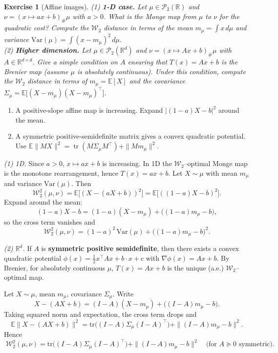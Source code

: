 \documentclass[11pt,a4paper]{article}
\theoremstyle{exostyle}
\newtheorem{exercise}{Exercise}
\newcommand{\R}{\mathbb{R}}
\newcommand{\push}{\#}
\newcommand{\Wtwo}{\mathcal{W}_2}
\begin{document}
\begin{exercise}[Affine images]\label{ex:affine}
(1) \textbf{1-D case.} Let $\mu\in\mathcal P_2(\R)$ and $\nu=(x\mapsto a x+b)_{\push}\mu$ with $a>0$. What is the Monge map from $\mu$ to $\nu$ for the quadratic cost? Compute the $\Wtwo$ distance in terms of the mean $m_\mu=\int x\,d\mu$ and variance $\mathrm{Var}(\mu)=\int (x-m_\mu)^2\,d\mu$.\\[4pt]
(2) \textbf{Higher dimension.} Let $\mu\in\mathcal P_2(\R^d)$ and $\nu=(x\mapsto A x+b)_{\push}\mu$ with $A\in\mathbb R^{d\times d}$. Give a simple condition on $A$ ensuring that $T(x)=A x+b$ is the Brenier map (assume $\mu$ is absolutely continuous). Under this condition, compute the $\Wtwo$ distance
in terms of $m_\mu=\mathbb E[X]$ and the covariance $\Sigma_\mu=\mathbb E\!\big[(X-m_\mu)(X-m_\mu)^\top\big]$.
\end{exercise}
\begin{hints}
\begin{enumerate}[label=(\arabic*)]\item A positive-slope affine map is increasing. Expand $|(1-a)X-b|^2$ around the mean.\item A symmetric positive-semidefinite matrix gives a convex quadratic potential. Use $\mathbb E\|MX\|^2=\operatorname{tr}(M\Sigma_\mu M^\top)+\|Mm_\mu\|^2$.\end{enumerate}
\end{hints}
\begin{solution}
\emph{(1) 1D.}
Since $a>0$, $x\mapsto ax+b$ is increasing. In 1D the $\Wtwo$--optimal Monge map is the monotone rearrangement, hence $T(x)=ax+b$. Let $X\sim\mu$ with mean $m_\mu$ and variance $\mathrm{Var}(\mu)$. Then
\[
\Wtwo^2(\mu,\nu)=\mathbb E\bigl[(X- (aX+b))^2\bigr]
=\mathbb E\bigl[((1-a)X-b)^2\bigr].
\]
Expand around the mean:
\[
(1-a)X-b=(1-a)(X-m_\mu)+\bigl((1-a)m_\mu-b\bigr),
\]
so the cross term vanishes and
\[
\boxed{\;
\Wtwo^2(\mu,\nu)=(1-a)^2\,\mathrm{Var}(\mu)+\bigl((1-a)m_\mu-b\bigr)^2.\;}
\]

\emph{(2) $\R^d$.}
If $A$ is \textbf{symmetric positive semidefinite}, then there exists a convex quadratic potential $\phi(x)=\tfrac12 x^\top A x+b\cdot x+c$ with $\nabla\phi(x)=Ax+b$. By Brenier, for absolutely continuous $\mu$, $T(x)=Ax+b$ is the unique (a.e.) $\Wtwo$--optimal map.

Let $X\sim\mu$, mean $m_\mu$, covariance $\Sigma_\mu$. Write
\[
X-(AX+b)=(I-A)(X-m_\mu)+\bigl((I-A)m_\mu-b\bigr).
\]
Taking squared norm and expectation, the cross term drops and
\[
\mathbb E\|X-(AX+b)\|^2=\mathrm{tr}\!\bigl((I-A)\Sigma_\mu(I-A)^\top\bigr)+\|(I-A)m_\mu-b\|^2.
\]
Hence
\[
\boxed{\;
\Wtwo^2(\mu,\nu)=\mathrm{tr}\!\bigl((I-A)\Sigma_\mu(I-A)^\top\bigr)+\|(I-A)m_\mu-b\|^2\quad
\text{(for }A\succeq0\text{ symmetric).}\;}
\]

\end{solution}
\end{document}
